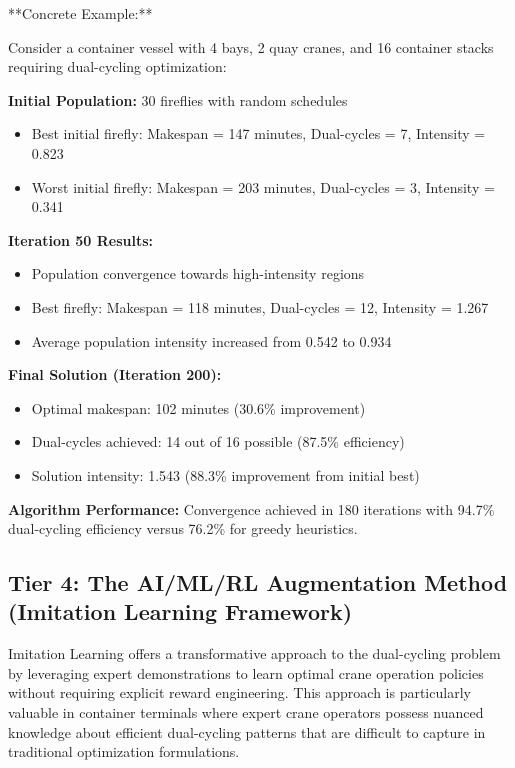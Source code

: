 \documentclass{article}
\begin{document}


**Concrete Example:**

Consider a container vessel with 4 bays, 2 quay cranes, and 16 container stacks requiring dual-cycling optimization:

\textbf{Initial Population:} 30 fireflies with random schedules
\begin{itemize}
\item Best initial firefly: Makespan = 147 minutes, Dual-cycles = 7, Intensity = 0.823
\item Worst initial firefly: Makespan = 203 minutes, Dual-cycles = 3, Intensity = 0.341
\end{itemize}

\textbf{Iteration 50 Results:}
\begin{itemize}
\item Population convergence towards high-intensity regions
\item Best firefly: Makespan = 118 minutes, Dual-cycles = 12, Intensity = 1.267
\item Average population intensity increased from 0.542 to 0.934
\end{itemize}

\textbf{Final Solution (Iteration 200):}
\begin{itemize}
\item Optimal makespan: 102 minutes (30.6\% improvement)
\item Dual-cycles achieved: 14 out of 16 possible (87.5\% efficiency)
\item Solution intensity: 1.543 (88.3\% improvement from initial best)
\end{itemize}

\textbf{Algorithm Performance:} Convergence achieved in 180 iterations with 94.7\% dual-cycling efficiency versus 76.2\% for greedy heuristics.

\subsection{Tier 4: The AI/ML/RL Augmentation Method (Imitation Learning Framework)}

Imitation Learning offers a transformative approach to the dual-cycling problem by leveraging expert demonstrations to learn optimal crane operation policies without requiring explicit reward engineering. This approach is particularly valuable in container terminals where expert crane operators possess nuanced knowledge about efficient dual-cycling patterns that are difficult to capture in traditional optimization formulations.
\end{document}
